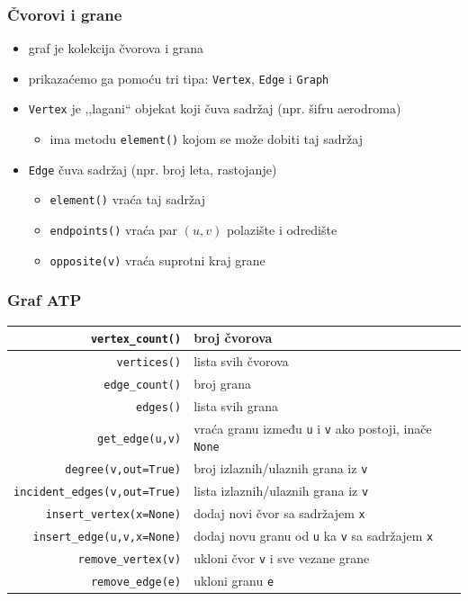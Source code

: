 \documentclass[compress]{beamer}
\begin{document}
\begin{frame}[fragile]
  \frametitle{Čvorovi i grane}
  \begin{itemize}
    \item graf je kolekcija čvorova i grana
    \item prikazaćemo ga pomoću tri tipa: \texttt{Vertex}, \texttt{Edge} 
    i \texttt{Graph}
    \item \texttt{Vertex} je ,,lagani`` objekat koji čuva sadržaj (npr.
    šifru aerodroma)
    \begin{itemize}
      \item ima metodu \texttt{element()} kojom se može dobiti taj sadržaj
    \end{itemize}
    \item \texttt{Edge} čuva sadržaj (npr. broj leta, rastojanje)
    \begin{itemize}
      \item \texttt{element()} vraća taj sadržaj
      \item \texttt{endpoints()} vraća par $(u,v)$ polazište i odredište
      \item \texttt{opposite(v)} vraća suprotni kraj grane
    \end{itemize}
  \end{itemize}
\end{frame}

\begin{frame}[fragile]
  \frametitle{Graf ATP}
  {\scriptsize
  \begin{tabular}{r|p{6cm}}
    \texttt{vertex\_count()} & broj čvorova \\ \hline
    \texttt{vertices()} & lista svih čvorova \\ \hline
    \texttt{edge\_count()} & broj grana \\ \hline
    \texttt{edges()} & lista svih grana \\ \hline
    \texttt{get\_edge(u,v)} & vraća granu između \texttt{u} i \texttt{v}
      ako postoji, inače \texttt{None} \\ \hline
    \texttt{degree(v,out=True)} & broj izlaznih/ulaznih grana iz 
      \texttt{v} \\ \hline
    \texttt{incident\_edges(v,out=True)} & lista izlaznih/ulaznih grana 
      iz \texttt{v} \\ \hline
    \texttt{insert\_vertex(x=None)} & dodaj novi čvor sa sadržajem 
      \texttt{x} \\ \hline
    \texttt{insert\_edge(u,v,x=None)} & dodaj novu granu od \texttt{u} 
      ka \texttt{v} sa sadržajem \texttt{x}\\ \hline
    \texttt{remove\_vertex(v)} & ukloni čvor \texttt{v} i sve vezane 
      grane \\ \hline
    \texttt{remove\_edge(e)} & ukloni granu \texttt{e} \\
  \end{tabular}
  }
\end{frame}
\end{document}
